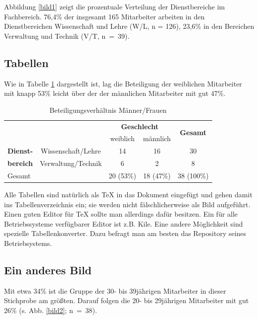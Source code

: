     Abbildung \ref{bild1} zeigt die prozentuale Verteilung der Dienstbereiche im Fachbereich. 76,4\% der insgesamt 165 Mitarbeiter arbeiten in den Dienstbereichen Wissenschaft und Lehre (W/L, n = 126), 23,6\% in den Bereichen Verwaltung und Technik (V/T, n~=~39). 

    \subsection*{Tabellen}
    
    Wie in Tabelle \ref{tabelleBeteiligungsverhaeltnis} dargestellt ist, lag die Beteiligung der weiblichen Mitarbeiter mit knapp 53\% leicht über der der männlichen Mitarbeiter mit gut 47\%.
        
    \begin{table}[h]
      \centering
      \caption{\label{tabelleBeteiligungsverhaeltnis} Beteiligungsverhältnis Männer/Frauen}
      \begin{tabular}{|l|c|c|c|c|} \hline
        \multicolumn{2}{|c|}{} & \multicolumn{2}{c|}{\textbf{Geschlecht}} & \multirow{2}{*}{\textbf{Gesamt}} \\  \cline {3-4}
        \multicolumn{2}{|c|}{} & weiblich & männlich & \\ \hline
        \textbf{Dienst-} & Wissenschaft/Lehre & 14 & 16 & 30 \\ \cline{2-5}
        \textbf{bereich} & Verwaltung/Technik & 6 & 2 & 8 \\ \hline
        \multicolumn{2}{|l|}{Gesamt} & 20 (53\%) & 18 (47\%) & 38 (100\%) \\ \hline
     \end{tabular}
   \end{table}
   
   Alle Tabellen sind natürlich als TeX in das Dokument eingefügt und gehen damit ins Tabellenverzeichnis ein; sie werden nicht fälschlicherweise als Bild aufgeführt. Einen guten Editor für TeX sollte man allerdings dafür besitzen. Ein für alle Betriebssysteme verfügbarer Editor ist z.B. Kile. Eine andere Möglichkeit sind spezielle Tabellenkonverter. Dazu befragt man am besten das Repository seines Betriebsystems.

    
    \subsection*{Ein anderes Bild}
    
    Mit etwa 34\% ist die Gruppe der 30- bis 39jährigen Mitarbeiter in dieser Stichprobe am größten. Darauf folgen die 20- bis 29jährigen Mitarbeiter mit gut 26\% (s. Abb. \ref{bild2}; n~=~38).
    
